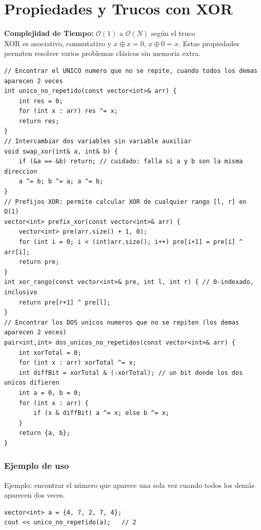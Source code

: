 \documentclass[10pt,twocolumn,letterpaper]{report}
\begin{document}
\section{Propiedades y Trucos con XOR}
\textbf{Complejidad de Tiempo:} $\mathcal{O}(1)$ a $\mathcal{O}(N)$ según el truco \\
XOR es asociativo, conmutativo y $x \oplus x = 0$, $x \oplus 0 = x$. Estas propiedades permiten resolver varios problemas clásicos sin memoria extra.
\begin{lstlisting}
// Encontrar el UNICO numero que no se repite, cuando todos los demas aparecen 2 veces
int unico_no_repetido(const vector<int>& arr) {
    int res = 0;
    for (int x : arr) res ^= x;
    return res;
}
// Intercambiar dos variables sin variable auxiliar
void swap_xor(int& a, int& b) {
    if (&a == &b) return; // cuidado: falla si a y b son la misma direccion
    a ^= b; b ^= a; a ^= b;
}
// Prefijos XOR: permite calcular XOR de cualquier rango [l, r] en O(1)
vector<int> prefix_xor(const vector<int>& arr) {
    vector<int> pre(arr.size() + 1, 0);
    for (int i = 0; i < (int)arr.size(); i++) pre[i+1] = pre[i] ^ arr[i];
    return pre;
}
int xor_rango(const vector<int>& pre, int l, int r) { // 0-indexado, inclusivo
    return pre[r+1] ^ pre[l];
}
// Encontrar los DOS unicos numeros que no se repiten (los demas aparecen 2 veces)
pair<int,int> dos_unicos_no_repetidos(const vector<int>& arr) {
    int xorTotal = 0;
    for (int x : arr) xorTotal ^= x;
    int diffBit = xorTotal & (-xorTotal); // un bit donde los dos unicos difieren
    int a = 0, b = 0;
    for (int x : arr) {
        if (x & diffBit) a ^= x; else b ^= x;
    }
    return {a, b};
}
\end{lstlisting}
\subsubsection*{Ejemplo de uso}
Ejemplo: encontrar el número que aparece una sola vez cuando todos los demás aparecen dos veces.
\begin{lstlisting}
vector<int> a = {4, 7, 2, 7, 4};
cout << unico_no_repetido(a);   // 2
\end{lstlisting}
\end{document}
